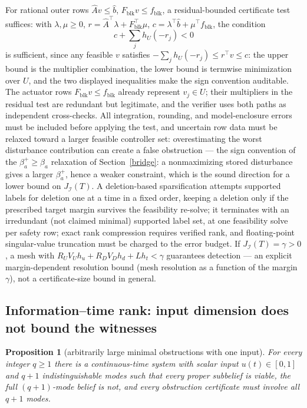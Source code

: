 \documentclass[10pt,twocolumn]{article}
\theoremstyle{plain}
\newtheorem{proposition}[theorem]{Proposition}
\theoremstyle{definition}
\theoremstyle{remark}
\begin{document}
For rational outer rows \(\widehat A v \le \widehat b\),
\(F_{\mathrm{blk}} v \le f_{\mathrm{blk}}\), a residual-bounded certificate
test suffices: with \(\lambda, \mu \ge 0\),
\(r = \widehat A^\top \lambda + F_{\mathrm{blk}}^\top \mu\),
\(c = \lambda^\top \widehat b + \mu^\top f_{\mathrm{blk}}\), the condition
\[
c + \sum_j h_U(-r_j) < 0
\tag{11}
\]
is sufficient, since any feasible \(v\) satisfies
\(-\sum_j h_U(-r_j) \le r^\top v \le c\): the upper bound is the
multiplier combination, the lower bound is termwise minimization over
\(U\), and the two displayed inequalities make the sign convention
auditable. The actuator rows \(F_{\mathrm{blk}} v \le f_{\mathrm{blk}}\)
already represent \(v_j \in U\); their multipliers in the residual test
are redundant but legitimate, and the verifier uses both paths as
independent cross-checks. All integration, rounding, and
model-enclosure errors must be included before applying the test, and
uncertain row data must be relaxed toward a larger feasible controller set:
overestimating the worst disturbance contribution can create a false
obstruction --- the sign convention of the \(\beta_a^{+} \ge \beta_a\)
relaxation of Section~\ref{bridge}: a nonmaximizing stored disturbance
gives a larger \(\beta_a^{+}\), hence a weaker constraint, which is the
sound direction for a lower bound on \(J_{\mathcal{I}}(T)\). A deletion-based sparsification attempts supported labels for deletion
one at a time in a fixed order, keeping a deletion only if the prescribed
target margin survives the feasibility re-solve; it terminates with an
irredundant (not claimed minimal) supported label set, at one feasibility
solve per safety row; exact rank compression requires verified rank, and
floating-point singular-value truncation must be charged to the error budget.
If \(J_{\mathcal{I}}(T) = \gamma > 0\), a mesh with
\(R_U V_U h_u + R_D V_D h_d + L h_t < \gamma\) guarantees detection --- an explicit margin-dependent resolution bound
(mesh resolution as a function of the margin \(\gamma\)), not a
certificate-size bound in general.

\subsection{Information--time rank: input dimension does not bound the witnesses}\label{rank}

\begin{proposition}[arbitrarily large minimal obstructions with one input]\label{prop:rank}
For every integer \(q \ge 1\) there is a continuous-time system with scalar
input \(u(t) \in [0,1]\) and \(q+1\) indistinguishable modes such that every
proper subbelief is viable, the full \((q{+}1)\)-mode belief is not, and
every obstruction certificate must involve all \(q+1\) modes.
\end{proposition}
\end{document}
